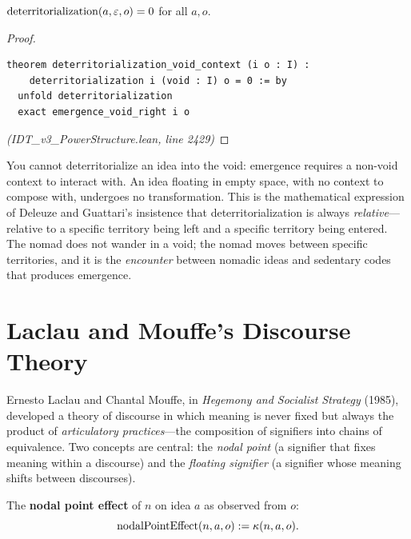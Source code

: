 \begin{theorem}
\label{thm:deterrit-void}
$\mathrm{deterritorialization}(a, \varepsilon, o) = 0$ for all $a, o$.
\end{theorem}

\begin{proof}
\begin{lstlisting}
theorem deterritorialization_void_context (i o : I) :
    deterritorialization i (void : I) o = 0 := by
  unfold deterritorialization
  exact emergence_void_right i o
\end{lstlisting}
\textit{(IDT\_v3\_PowerStructure.lean, line 2429)}
\end{proof}

\begin{interpretation}
You cannot deterritorialize an idea into the void: emergence requires a
non-void context to interact with. An idea floating in empty space, with no
context to compose with, undergoes no transformation. This is the mathematical
expression of Deleuze and Guattari's insistence that deterritorialization is
always \emph{relative}---relative to a specific territory being left and a
specific territory being entered. The nomad does not wander in a void; the
nomad moves between specific territories, and it is the \emph{encounter}
between nomadic ideas and sedentary codes that produces emergence.
\end{interpretation}

\section{Laclau and Mouffe's Discourse Theory}

Ernesto Laclau and Chantal Mouffe, in \emph{Hegemony and Socialist Strategy}
(1985), developed a theory of discourse in which meaning is never fixed but
always the product of \emph{articulatory practices}---the composition of
signifiers into chains of equivalence. Two concepts are central: the
\emph{nodal point} (a signifier that fixes meaning within a discourse) and the
\emph{floating signifier} (a signifier whose meaning shifts between discourses).

\begin{definition}
\label{def:nodal-point}
The \textbf{nodal point effect} of $n$ on idea $a$ as observed from $o$:
\[
  \mathrm{nodalPointEffect}(n, a, o) := \kappa(n, a, o).
\]
\end{definition}

